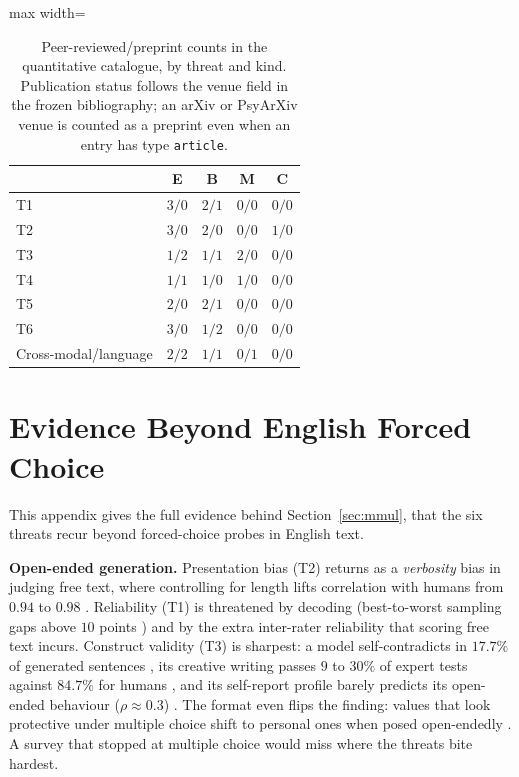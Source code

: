 \documentclass[11pt]{article}
\begin{document}
\begin{table}[H]
\centering
\scriptsize
\setlength{\tabcolsep}{3.5pt}
\begin{adjustbox}{max width=\columnwidth}
\begin{tabular}{@{}lcccc@{}}
\toprule
& \textbf{E} & \textbf{B} & \textbf{M} & \textbf{C} \\
\midrule
T1 & $3/0$ & $2/1$ & $0/0$ & $0/0$ \\
T2 & $3/0$ & $2/0$ & $0/0$ & $1/0$ \\
T3 & $1/2$ & $1/1$ & $2/0$ & $0/0$ \\
T4 & $1/1$ & $1/0$ & $1/0$ & $0/0$ \\
T5 & $2/0$ & $2/1$ & $0/0$ & $0/0$ \\
T6 & $3/0$ & $1/2$ & $0/0$ & $0/0$ \\
Cross-modal/language & $2/2$ & $1/1$ & $0/1$ & $0/0$ \\
\bottomrule
\end{tabular}
\end{adjustbox}
\caption{Peer-reviewed/preprint counts in the quantitative catalogue, by threat
and kind. Publication status follows the venue field in the frozen bibliography;
an arXiv or PsyArXiv venue is counted as a preprint even when an entry has type
\texttt{article}.}
\label{tab:statuscounts}
\end{table}




\clearpage
\section{Evidence Beyond English Forced Choice}
\label{app:mmul}

This appendix gives the full evidence behind Section~\ref{sec:mmul}, that the
six threats recur beyond forced-choice probes in English text.

\textbf{Open-ended generation.} Presentation bias (T2) returns as a
\emph{verbosity} bias in judging free text, where controlling for length lifts
correlation with humans from $0.94$ to $0.98$ \cite{dubois2024lengthcontrolled}.
Reliability (T1) is threatened by decoding (best-to-worst sampling gaps above
$10$ points \cite{song2024greedy}) and by the extra inter-rater reliability
that scoring free text incurs. Construct validity (T3) is sharpest: a model
self-contradicts in $17.7\%$ of generated sentences
\cite{mundler2024selfcontradictory}, its creative writing passes $9$ to $30\%$
of expert tests against $84.7\%$ for humans \cite{chakrabarty2024artorartifice},
and its self-report profile barely predicts its open-ended behaviour
($\rho\approx0.3$) \cite{song2025psychometric}. The format even flips the
finding: values that look protective under multiple choice shift to personal
ones when posed open-endedly \cite{liu2025conflictscope,moore2024valueconsistency}.
A survey that stopped at multiple choice would miss where the threats bite
hardest.
\end{document}

